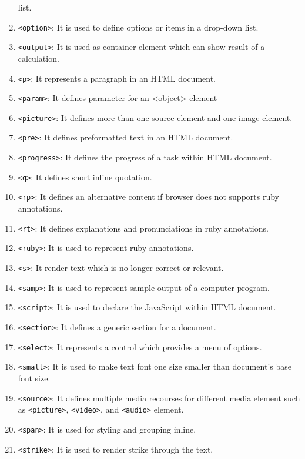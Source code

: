 \documentclass[a4paper]{article}
\begin{document}
\begin{enumerate}
      list.
    \item \texttt{<option>}: It is used to define options or items in a 
      drop-down list.
    \item \texttt{<output>}: It is used as container element which can show 
      result of a calculation.
    \item \texttt{<p>}: It represents a paragraph in an HTML document.
    \item \texttt{<param>}: It defines parameter for an <object> element
    \item \texttt{<picture>}: It defines more than one source element and 
      one image element.
    \item \texttt{<pre>}: It defines preformatted text in an HTML document.
    \item \texttt{<progress>}: It defines the progress of a task within HTML 
      document.
    \item \texttt{<q>}: It defines short inline quotation.
    \item \texttt{<rp>}: It defines an alternative content if browser does 
      not supports ruby annotations.
    \item \texttt{<rt>}: It defines explanations and pronunciations in ruby 
      annotations.
    \item \texttt{<ruby>}: It is used to represent ruby annotations.
    \item \texttt{<s>}: It render text which is no longer correct or relevant.
    \item \texttt{<samp>}: It is used to represent sample output of a computer
      program.
    \item \texttt{<script>}: It is used to declare the JavaScript within HTML
      document.
    \item \texttt{<section>}: It defines a generic section for a document.
    \item \texttt{<select>}: It represents a control which provides a menu
      of options.
    \item \texttt{<small>}: It is used to make text font one size smaller
      than document's base font size.
    \item \texttt{<source>}: It defines multiple media recourses for different
      media element such as \texttt{<picture>}, \texttt{<video>}, and
      \texttt{<audio>} element.
    \item \texttt{<span>}: It is used for styling and grouping inline.
    \item \texttt{<strike>}: It is used to render strike through the text.

\end{enumerate}
\end{document}

